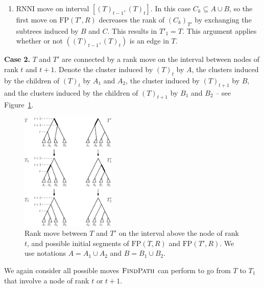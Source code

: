 \documentclass[11pt]{amsart}
\newcommand{\rnni}{\mathrm{RNNI}}
\newcommand{\findpath}{\textsc{FindPath}}
\newcommand{\fp}{\mathrm{FP}}
\begin{document}
\begin{enumerate}[label = 1.{\arabic*}]
\item $\rnni$ move on interval $[(T)_{t-1},(T)_t]$.
In this case $C_k \subseteq A \cup B$, so the first move on $\fp(T', R)$ decreases the rank of $(C_k)_{T'}$ by exchanging the subtrees induced by $B$ and $C$.
This results in $T'_1 = T$.
This argument applies whether or not $((T)_{t-1},(T)_t)$ is an edge in $T$.
\end{enumerate}

\textbf{Case 2.}
$T$ and $T'$ are connected by a rank move on the interval between nodes of rank $t$ and $t+1$.
Denote the cluster induced by $(T)_t$ by $A$, the clusters induced by the children of $(T)_t$ by $A_1$ and $A_2$, the cluster induced by $(T)_{t+1}$ by $B$, and the clusters induced by the children of $(T)_{t+1}$ by $B_1$ and $B_2$ -- see Figure~\ref{fig:thm_fp_rank1}.

\begin{figure}[ht]
\centering
\includegraphics[width=0.4\textwidth]{thm_fp_rank1}
\caption{Rank move between $T$ and $T'$ on the interval above the node of rank $t$, and possible initial segments of $\fp(T, R)$ and $\fp(T', R)$.
We use notations ${A = A_1 \cup A_2}$ and $B = B_1 \cup B_2$.}
\label{fig:thm_fp_rank1}
\end{figure}

We again consider all possible moves $\findpath$ can perform to go from $T$ to $T_1$ that involve a node of rank $t$ or $t+1$.
\end{document}
